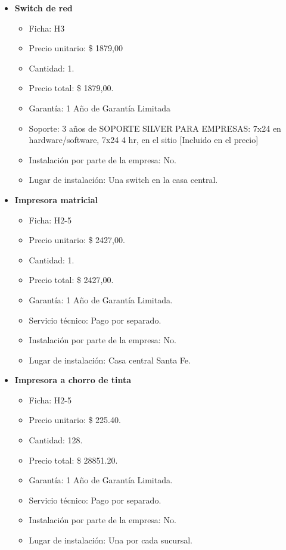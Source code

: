 \begin{itemize}
  \item \textbf{Switch de red}
    \begin{itemize}
      \item Ficha: H3
      \item Precio unitario: \$ 1879,00
      \item Cantidad: 1.
      \item Precio total: \$ 1879,00.
      
      \item Garantía: 1 Año de Garantía Limitada
      \item Soporte: 3 años de SOPORTE SILVER PARA EMPRESAS: 7x24 en hardware/software, 7x24 4 hr, en el sitio [Incluido en el precio]
      \item Instalación por parte de la empresa: No.
      \item Lugar de instalación: Una switch en la casa central.
    \end{itemize}
  
  \item \textbf{Impresora matricial}
    \begin{itemize}
      \item Ficha: H2-5
      \item Precio unitario: \$ 2427,00.
      \item Cantidad: 1.
      \item Precio total: \$ 2427,00.
      \item Garantía: 1 Año de Garantía Limitada.
      \item Servicio técnico: Pago por separado.
      \item Instalación por parte de la empresa: No.
      \item Lugar de instalación: Casa central Santa Fe.
    \end{itemize}
    
  \item \textbf{Impresora a chorro de tinta}
    \begin{itemize}
      \item Ficha: H2-5
      \item Precio unitario: \$ 225.40.
      \item Cantidad: 128.
      \item Precio total: \$ 28851.20.
      \item Garantía: 1 Año de Garantía Limitada.
      \item Servicio técnico: Pago por separado.
      \item Instalación por parte de la empresa: No.
      \item Lugar de instalación: Una por cada sucursal.
    \end{itemize}
    

\end{itemize}
